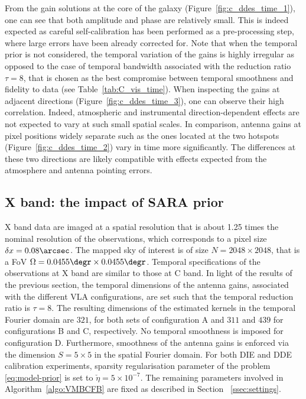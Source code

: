\documentclass[fleqn,usenatbib]{mnras}
\begin{document}
From the gain solutions at the core of the galaxy (Figure~\ref{fig:c_ddes_time_1}), one can see that both amplitude and phase are relatively small. This is indeed expected as careful self-calibration has been performed as a pre-processing step, where large errors have been already corrected for. Note that when the temporal prior is not considered, the temporal variation of the gains is highly irregular as opposed to the case of temporal bandwidth associated with the reduction ratio $\tau =8$, that is chosen as the best compromise between temporal smoothness and fidelity to data (see Table~\ref{tab:C_vis_time}). When inspecting the gains at adjacent directions (Figure~\ref{fig:c_ddes_time_3}), one can observe their high correlation. Indeed, atmospheric and instrumental direction-dependent effects are not expected to vary at such small spatial scales. In comparison, antenna gains at pixel positions widely separate such as the ones located at the two hotspots (Figure~\ref{fig:c_ddes_time_2}) vary in time more significantly. The differences at these two directions are likely compatible with effects expected from the atmosphere and antenna pointing errors.

%



\subsection{X band: the impact of SARA prior }%
X band data are imaged at a spatial resolution that is about 1.25 times the nominal resolution of the observations, which corresponds to a pixel size $\delta x=0.08\arcsec$. The mapped sky of interest is of size $N=2048\times 2048$, that is a FoV $\Omega= 0.0455\degr \times 0.0455\degr $. Temporal specifications of the observations at X band are similar to those at C band. In light of the results of the previous section, the temporal dimensions of the antenna gains, associated with the different {{VLA}} configurations, are set such {{that}} the temporal reduction ratio is $\tau=8$. The resulting dimensions of the estimated kernels in the temporal Fourier domain are $321$, for both sets of configuration A and $311$ and $439$ for configurations B and C, respectively. No temporal smoothness is imposed for configuration D. Furthermore, smoothness of the antenna gains is enforced via the dimension $S =5 \times 5$ in the spatial Fourier domain. For both DIE and DDE calibration experiments, sparsity regularisation parameter of the problem \eqref{eq:model-prior} is set to $\check{\eta} =5 \times 10^{-7}$. The remaining parameters involved in Algorithm~\ref{algo:VMBCFB} are fixed as described in Section ~\ref{ssec:settings}. 
\end{document}
